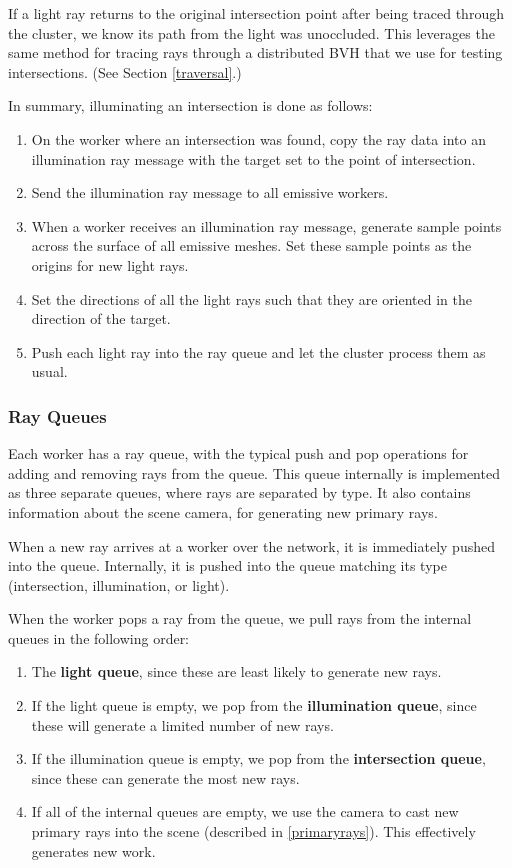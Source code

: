 \documentclass[a4paper,twoside]{article}
\begin{document}
If a light ray returns to the original intersection point after being
traced through the cluster, we know its path from the light was unoccluded.
This leverages the same method for tracing rays through a distributed BVH that
we use for testing intersections. (See Section \ref{traversal}.)

In summary, illuminating an intersection is done as follows:

\begin{enumerate}
    \item On the worker where an intersection was found, copy the ray data into
        an illumination ray message with the target set to the point of
        intersection.
    \item Send the illumination ray message to all emissive workers.
    \item When a worker receives an illumination ray message, generate sample
        points across the surface of all emissive meshes. Set these sample
        points as the origins for new light rays.
    \item Set the directions of all the light rays such that they are oriented
        in the direction of the target.
    \item Push each light ray into the ray queue and let the cluster process
        them as usual.
\end{enumerate}


\subsubsection {Ray Queues}
\label{queues}

Each worker has a ray queue, with the typical push and pop operations for adding
and removing rays from the queue. This queue internally is implemented as three
separate queues, where rays are separated by type. It also contains information
about the scene camera, for generating new primary rays.

When a new ray arrives at a worker over the network, it is immediately pushed
into the queue. Internally, it is pushed into the queue matching its type
(intersection, illumination, or light).

When the worker pops a ray from the queue, we pull rays from the internal
queues in the following order:

\begin{enumerate}
   \item The \textbf{light queue}, since these are least likely to generate
      new rays.
   \item If the light queue is empty, we pop from the \textbf{illumination queue},
      since these will generate a limited number of new rays.
   \item If the illumination queue is empty, we pop from the
      \textbf{intersection queue}, since these can generate the most new rays.
   \item If all of the internal queues are empty, we use the camera to cast
      new primary rays into the scene (described in \ref{primaryrays}). This
      effectively generates new work.
\end{enumerate}
\end{document}
